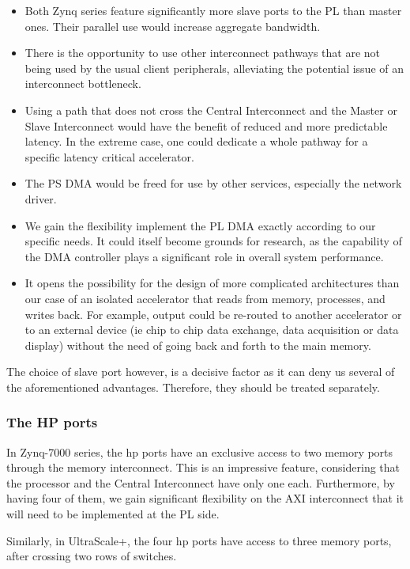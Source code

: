 \begin{itemize}
\item	Both Zynq series feature significantly more 
	slave ports to the PL than master ones.
	Their parallel use would increase aggregate bandwidth.
\item	There is the opportunity to use other interconnect pathways that are not
	being used by the usual client peripherals, alleviating the potential
	issue of an interconnect bottleneck.
\item	Using a path that does not cross the Central Interconnect and the
	Master or Slave Interconnect would have the benefit of 
	reduced and more predictable latency. 
	In the extreme case, one could dedicate a whole pathway 
	for a specific latency critical accelerator.
\item	The PS DMA would be freed for use by other services, 
	especially the network driver.
\item	We gain the flexibility implement the PL DMA
	exactly according to our specific needs.
	It could itself become grounds for research,
	as the capability of the DMA controller
	plays a significant role in overall system performance.
\item	It opens the possibility for the design of more complicated 
	architectures than our case of an isolated accelerator 
	that reads from memory, processes, and writes back.
	For example, output could be re-routed to 
	another accelerator or to an external device
	(ie chip to chip data exchange, data acquisition or data display)
	without the need of going back and forth to the main memory.
\end{itemize}

The choice of slave port however, is a decisive factor 
as it can deny us several of the aforementioned advantages.
Therefore, they should be treated separately.

\subsubsection{The HP ports}

In Zynq-7000 series, the \gls{hp} ports have an 
exclusive access to two memory ports 
through the memory interconnect.
This is an impressive feature, considering that the processor and
the Central Interconnect have only one each.
Furthermore, by having four of them, 
we gain significant flexibility on the AXI interconnect
that it will need to be implemented at the PL side.

Similarly, in UltraScale+, the four \gls{hp} ports have
access to three memory ports, after crossing two rows of switches.


